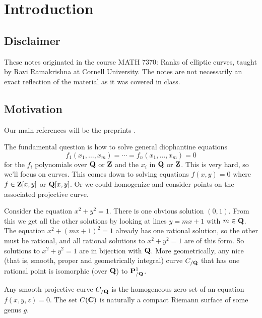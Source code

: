 
\section{Introduction}





\subsection{Disclaimer}

These notes originated in the course MATH 7370: Ranks of elliptic curves, 
taught by Ravi Ramakrishna at Cornell University. The notes are not necessarily 
an exact reflection of the material as it was covered in class. 





\subsection{Motivation}

Our main references will be the preprints 
\cite{
  bhargava-shankar-1,
  bhargava-shankar-2,
  bhargava-shankar-3,
  bhargava-shankar-4,
  bhargava-skinner,
  bhargava-skinner-zhang}. 

The fundamental question is how to solve general diophantine equations 
\[
  f_1(x_1,\dots,x_m) = \cdots = f_n(x_1,\dots,x_m) = 0
\]
for the $f_i$ polynomials over $\mathbf{Q}$ or $\mathbf{Z}$ and the $x_i$ in $\mathbf{Q}$ or $\mathbf{Z}$. 
This is very hard, so we'll focus on curves. This comes down to solving 
equations $f(x,y)=0$ where $f\in \mathbf{Z}[x,y]$ or $\mathbf{Q}[x,y]$. Or we could 
homogenize and consider points on the associated projective curve. 

\begin{example}
Consider the equation $x^2+y^2=1$. There is one obvious solution $(0,1)$. From 
this we get all the other solutions by looking at lines $y=m x+1$ with 
$m\in \mathbf{Q}$. The equation $x^2+(m x+1)^2=1$ already has one rational solution, 
so the other must be rational, and all rational solutions to $x^2+y^2=1$ are of 
this form. So solutions to $x^2+y^2=1$ are in bijection with $\mathbf{Q}$. More 
geometrically, any nice (that is, smooth, proper and geometrically integral) 
curve $C_{/\mathbf{Q}}$ that has one rational point is isomorphic (over $\mathbf{Q}$) to 
$\mathbf{P}^1_{/\mathbf{Q}}$. 
\end{example}

Any smooth projective curve $C_{/\mathbf{Q}}$ is the homogeneous zero-set of an 
equation $f(x,y,z)=0$. The set $C(\mathbf{C})$ is naturally a compact Riemann surface 
of some genus $g$. 

